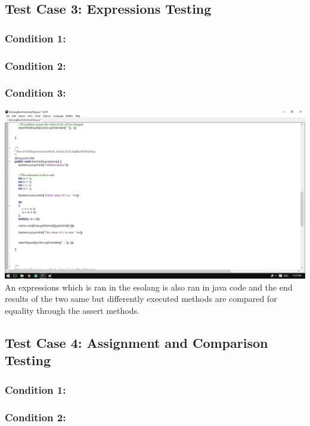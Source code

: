 \documentclass[english]{article}
\begin{document}
			\subsection{Test Case 3: Expressions Testing}
			\subsubsection{Condition 1: }
			\subsubsection{Condition 2: }
			\subsubsection{Condition 3: }			
			\includegraphics[width=\linewidth]{test3.jpg}
			\\[12pt]		
			An expressions which is ran in the esolang is also ran in java code and the end results of the two same but differently executed methods are compared for equality through the assert methods. 	
			\subsection{Test Case 4: Assignment and Comparison Testing}
			\subsubsection{Condition 1: }
			\subsubsection{Condition 2: }
\end{document}
